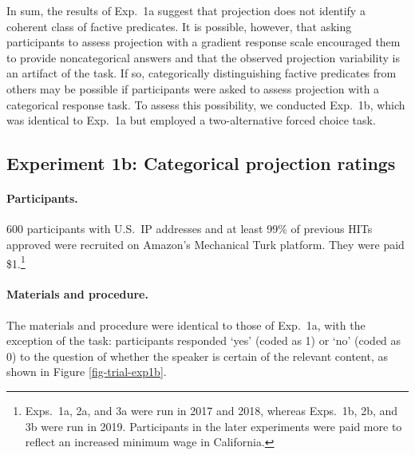\documentclass{language}
\newcommand{\6}{\mbox{$[\hspace*{-.6mm}[$}}
\newcommand{\9}{\mbox{$]\hspace*{-.6mm}]$}}
\begin{document}
In sum, the results of Exp.~1a suggest that projection does not identify a coherent class of factive predicates. It is possible, however, that asking participants to assess projection with a gradient response scale encouraged them to provide noncategorical answers and that the observed projection variability is an artifact of the task. If so, categorically distinguishing factive predicates from others may be possible if participants were asked to assess projection with a categorical response task. To assess this possibility, we conducted Exp.~1b, which was identical to Exp.~1a but employed a two-alternative forced choice task.


\subsection{Experiment 1b: Categorical projection ratings}\label{s-exp1b}


\paragraph{Participants.} 600 participants with U.S.\ IP addresses and at least 99\% of previous HITs approved were recruited on Amazon's Mechanical Turk platform. They were paid \$1.\footnote{Exps.~1a, 2a, and 3a were run in 2017 and 2018, whereas  Exps.~1b, 2b, and 3b were run in 2019. Participants in the later experiments were paid more to reflect an increased minimum wage in California.}


\paragraph{Materials and procedure.} The materials and procedure were identical to those of Exp.~1a, with the exception of the task: participants responded `yes' (coded as 1) or `no' (coded as 0) to the question of whether the speaker is certain of the relevant content, as shown in Figure \ref{fig-trial-exp1b}.
\end{document}
